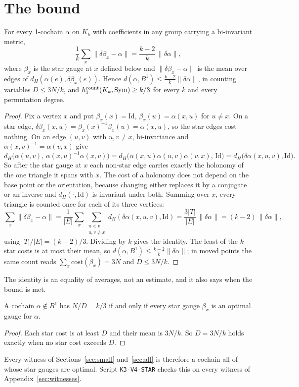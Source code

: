 \documentclass[11pt]{article}
\theoremstyle{remark}\newtheorem{remark}[theorem]{Remark}
\newcommand{\Sym}{\mathrm{Sym}}\newcommand{\dH}{d_H}\newcommand{\F}{\mathbb{F}}\newcommand{\Z}{\mathbb{Z}}
\newcommand{\Id}{\mathrm{Id}}\newcommand{\Tr}{\operatorname{Tr}}
\begin{document}
\section{The bound}\label{sec:bound}
\begin{proposition}\label{prop:cl}
For every 1-cochain $\alpha$ on $K_k$ with coefficients in any group carrying a bi-invariant metric,
\[
\frac1k\sum_{x}\|\delta\beta_x-\alpha\|=\frac{k-2}{k}\,\|\delta\alpha\|,
\]
where $\beta_x$ is the star gauge at $x$ defined below and $\|\delta\beta_x-\alpha\|$ is the mean over edges of $\dH(\alpha(e),\delta\beta_x(e))$. Hence $d(\alpha,B^1)\le\frac{k-2}{k}\|\delta\alpha\|$, in counting variables $D\le 3N/k$, and $h_1^{\rm count}(K_k,\Sym)\ge k/3$ for every $k$ and every permutation degree.
\end{proposition}
\begin{proof}
Fix a vertex $x$ and put $\beta_x(x)=\Id$, $\beta_x(u)=\alpha(x,u)$ for $u\ne x$. On a star edge, $\delta\beta_x(x,u)=\beta_x(x)^{-1}\beta_x(u)=\alpha(x,u)$, so the star edges cost nothing. On an edge $(u,v)$ with $u,v\ne x$, bi-invariance and $\alpha(x,v)^{-1}=\alpha(v,x)$ give
\[
\dH\big(\alpha(u,v),\,\alpha(x,u)^{-1}\alpha(x,v)\big)=\dH\big(\alpha(x,u)\alpha(u,v)\alpha(v,x),\,\Id\big)=\dH\big(\delta\alpha(x,u,v),\Id\big).
\]
So after the star gauge at $x$ each non-star edge carries exactly the holonomy of the one triangle it spans with $x$. The cost of a holonomy does not depend on the base point or the orientation, because changing either replaces it by a conjugate or an inverse and $\dH(\cdot,\Id)$ is invariant under both. Summing over $x$, every triangle is counted once for each of its three vertices:
\[
\sum_x\|\delta\beta_x-\alpha\|=\frac1{|E|}\sum_x\sum_{\substack{u<v\\u,v\ne x}}\dH(\delta\alpha(x,u,v),\Id)=\frac{3|T|}{|E|}\,\|\delta\alpha\|=(k-2)\,\|\delta\alpha\|,
\]
using $|T|/|E|=(k-2)/3$. Dividing by $k$ gives the identity. The least of the $k$ star costs is at most their mean, so $d(\alpha,B^1)\le\frac{k-2}{k}\|\delta\alpha\|$; in moved points the same count reads $\sum_x\mathrm{cost}(\beta_x)=3N$ and $D\le 3N/k$.
\end{proof}
The identity is an equality of averages, not an estimate, and it also says when the bound is met.
\begin{corollary}\label{cor:equality}
A cochain $\alpha\notin B^1$ has $N/D=k/3$ if and only if every star gauge $\beta_x$ is an optimal gauge for $\alpha$.
\end{corollary}
\begin{proof}
Each star cost is at least $D$ and their mean is $3N/k$. So $D=3N/k$ holds exactly when no star cost exceeds $D$.
\end{proof}
Every witness of Sections~\ref{sec:small} and~\ref{sec:all} is therefore a cochain all of whose star gauges are optimal. Script \texttt{K3-V4-STAR} checks this on every witness of Appendix~\ref{sec:witnesses}.
\end{document}

